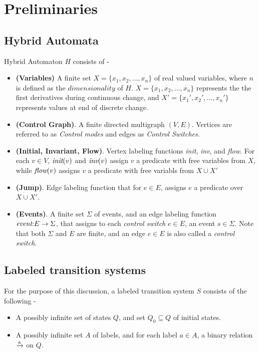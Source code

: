 \documentclass[]{article}
\begin{document}
\section{Preliminaries}
\subsection{Hybrid Automata}
Hybrid Automaton $H$ consists of -
\begin{itemize}
  \item \textbf{(Variables)} A finite set $X = \{x_1, x_2, \dots, x_n\} $ of real valued variables,
    where $n$ is defined as the $dimensionality$ of $H$.
     $\dot{X} = \{\dot{x_1}, \dot{x_2}, \dots, \dot{x_n} \}$ represents the
     the first derivatives during continuous change, and $X' = \{x_1', x_2',
     \dots, x_n' \}$ represents values at end of discrete change.
   \item \textbf{(Control Graph)}. A finite directed multigraph $(V,E)$.
     Vertices are referred to as \textit{Control modes} and edges as
     \textit{Control Switches}.
   \item \textbf{(Initial, Invariant, Flow)}. Vertex labeling functions
     \textit{init}, \textit{inv}, and \textit{flow}. For each $v \in V$,
     $\textit{init}(v)$ and $\textit{inv}(v)$ assign $v$ a predicate with free variables from
     $X$, while $\textit{flow}(v)$ assigns $v$ a predicate with free variabls from $X
     \cup X'$
   \item \textbf{(Jump)}. Edge labeling function that for $e \in E$, assigns $e$
     a predicate over $X \cup X'$.
   \item \textbf{(Events)}. A finite set $\Sigma$ of events, and an edge
     labeling function $\textit{event} \mathord{:} E \to \Sigma$, that assigns to each \textit{control
     switch} $e \in E$, an event $s \in \Sigma$. Note that both $\Sigma$ and $E$
     are finite, and an edge $e \in E$ is also called a \textit{control switch}.

\end{itemize}

\subsection{Labeled transition systems}
For the purpose of this discussion, a labeled transition system $S$ consists of the following -
\begin{itemize}
  \item A possibly infinite set of states $Q$, and set $Q_0 \subseteq Q$ of
    initial states.
  \item A possibly infinite set $A$ of labels, and for each label $a \in A$, a
    binary relation $\xrightarrow{\text{a}}$ on $Q$.
\end{itemize}
\end{document}
